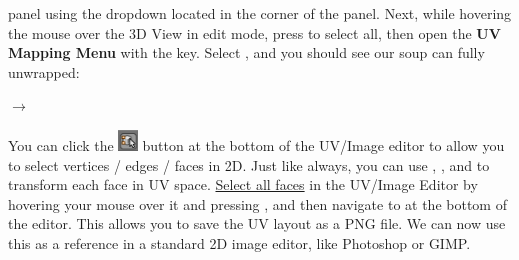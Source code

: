 \documentclass[11pt]{article}
\begin{document}
panel using the dropdown located in the corner of the panel.  Next, while hovering the mouse over
the 3D View in edit mode, press  to select all, then open the \textbf{UV Mapping Menu}
with the  key.  Select , and you should see our soup can fully unwrapped:
\begin{center}
     $\rightarrow$
\end{center}
You can click the \includegraphics[height=1.5em]{uvsync-button} button at the bottom of the UV/Image
editor to allow you to select vertices / edges / faces in 2D.  Just like always, you can use 
, , and  to transform each face in UV space.  \underline{Select all faces} in the
UV/Image Editor by hovering your mouse over it and pressing , and then navigate to
 at the bottom of the editor.  This allows you to save the UV layout as a
PNG file.  We can now use this as a reference in a standard 2D image editor, like Photoshop or GIMP.
\end{document}
